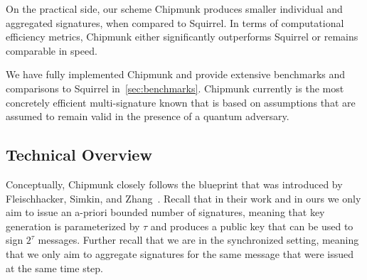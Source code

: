 On the practical side, our scheme Chipmunk produces smaller individual and aggregated signatures, when compared to Squirrel.
In terms of computational efficiency metrics, Chipmunk either significantly outperforms Squirrel or remains comparable in speed.

We have fully implemented Chipmunk and provide extensive benchmarks and comparisons to Squirrel in~\autoref{sec:benchmarks}.
Chipmunk currently is the most concretely efficient multi-signature known that is based on assumptions that are assumed to remain valid in the presence of a quantum adversary.

\subsection{Technical Overview}\label{sec:intro-tech-overview}

Conceptually, Chipmunk closely follows the blueprint that was introduced by Fleischhacker, Simkin, and Zhang~\cite{CCS:FleSimZha22}.
Recall that in their work and in ours we only aim to issue an a-priori bounded number of signatures, meaning that key generation is parameterized by $\tau$ and produces a public key that can be used to sign $2^\tau$ messages.
Further recall that we are in the synchronized setting, meaning that we only aim to aggregate signatures for the same message that were issued at the same time step.

